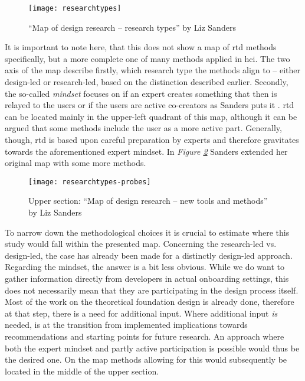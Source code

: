 \begin{figure}[h]
  \centering
  \texttt{[image: researchtypes]}
  \caption{\enquote{Map of design research -- research types} by Liz Sanders \cite[p. 3]{sanders2008evolving}}
  \label{fig:researchtypes}
\end{figure}

It is important to note here, that this does not show a map of \gls{rtd} methods specifically, but a more complete one of many methods applied in \gls{hci}. The two axis of the map describe firstly, which research type the methods align to -- either design-led or research-led, based on the distinction described earlier. Secondly, the so-called \textit{mindset} focuses on if an expert creates something that then is relayed to the users or if the users are active co-creators as Sanders puts it \cite[p. 5-6]{sanders2008evolving}. \gls{rtd} can be located mainly in the upper-left quadrant of this map, although it can be argued that some methods include the user as a more active part. Generally, though, \gls{rtd} is based upon careful preparation by experts and therefore gravitates towards the aforementioned expert mindset. In \textit{Figure \ref{fig:researchtypes-probes}} Sanders extended her original map with some more methods.

\begin{figure}[h]
  \centering
  \texttt{[image: researchtypes-probes]}
  \caption{Upper section: \enquote{Map of design research -- new tools and methods} by Liz Sanders \cite[p. 6]{sanders2008evolving}}
  \label{fig:researchtypes-probes}
\end{figure}

To narrow down the methodological choices it is crucial to estimate where this study would fall within the presented map. Concerning the research-led vs. design-led, the case has already been made for a distinctly design-led approach. Regarding the mindset, the answer is a bit less obvious. While we do want to gather information directly from developers in actual onboarding settings, this does not necessarily mean that they are participating in the design process itself. Most of the work on the theoretical foundation design is already done, therefore at that step, there is a need for additional input. Where additional input \textit{is} needed, is at the transition from implemented implications towards recommendations and starting points for future research. An approach where both the expert mindset and partly active participation is possible would thus be the desired one. On the map methods allowing for this would subsequently be located in the middle of the upper section.


